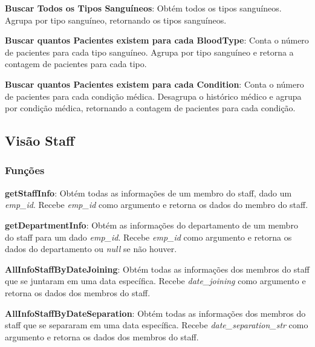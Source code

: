 \textbf{Buscar Todos os Tipos Sanguíneos}: Obtém todos os tipos sanguíneos. Agrupa por tipo sanguíneo, retornando os tipos sanguíneos.

\vspace{0.15cm}

\textbf{Buscar quantos Pacientes existem para cada BloodType}: Conta o número de pacientes para cada tipo sanguíneo. Agrupa por tipo sanguíneo e retorna a contagem de pacientes para cada tipo.

\vspace{0.15cm}

\textbf{Buscar quantos Pacientes existem para cada Condition}: Conta o número de pacientes para cada condição médica. Desagrupa o histórico médico e agrupa por condição médica, retornando a contagem de pacientes para cada condição.

\subsection{Visão Staff}
\subsubsection{Funções}

\vspace{0.15cm}

\textbf{getStaffInfo}: Obtém todas as informações de um membro do staff, dado um \textit{emp\_id}. Recebe \textit{emp\_id} como argumento e retorna os dados do membro do staff.

\vspace{0.15cm}

\textbf{getDepartmentInfo}: Obtém as informações do departamento de um membro do staff para um dado \textit{emp\_id}. Recebe \textit{emp\_id} como argumento e retorna os dados do departamento ou \textit{null} se não houver.

\vspace{0.15cm}

\textbf{AllInfoStaffByDateJoining}: Obtém todas as informações dos membros do staff que se juntaram em uma data específica. Recebe \textit{date\_joining} como argumento e retorna os dados dos membros do staff.

\vspace{0.15cm}

\textbf{AllInfoStaffByDateSeparation}: Obtém todas as informações dos membros do staff que se separaram em uma data específica. Recebe \textit{date\_separation\_str} como argumento e retorna os dados dos membros do staff.

